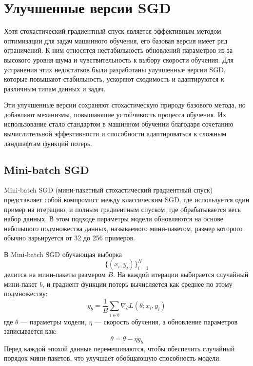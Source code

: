 \documentclass[11pt,a4paper]{article}
\begin{document}
\section{Улучшенные версии SGD}

Хотя стохастический градиентный спуск является эффективным методом оптимизации для задач машинного обучения, его базовая версия имеет ряд ограничений. К ним относятся нестабильность обновлений параметров из-за высокого уровня шума и чувствительность к выбору скорости обучения. Для устранения этих недостатков были разработаны улучшенные версии SGD, которые повышают стабильность, ускоряют сходимость и адаптируются к различным типам данных и задач.

Эти улучшенные версии сохраняют стохастическую природу базового метода, но добавляют механизмы, повышающие устойчивость процесса обучения. Их использование стало стандартом в машинном обучении благодаря сочетанию вычислительной эффективности и способности адаптироваться к сложным ландшафтам функций потерь.

\subsection{Mini-batch SGD}

Mini-batch SGD (мини-пакетный стохастический градиентный спуск) представляет собой компромисс между классическим SGD, где используется один пример на итерацию, и полным градиентным спуском, где обрабатывается весь набор данных. В этом подходе параметры модели обновляются на основе небольшого подмножества данных, называемого мини-пакетом, размер которого обычно варьируется от 32 до 256 примеров.

В Mini-batch SGD обучающая выборка 
\begin{equation}
\{(x_i, y_i)\}_{i=1}^N
\end{equation}
делится на мини-пакеты размером \( B \). На каждой итерации выбирается случайный мини-пакет \( b \), и градиент функции потерь вычисляется как среднее по этому подмножеству:
\begin{equation}
g_b = \frac{1}{B} \sum_{i \in b} \nabla_\theta L(\theta; x_i, y_i)
\end{equation}
где \( \theta \) — параметры модели, \( \eta \) — скорость обучения, а обновление параметров записывается как:
\begin{equation}
\theta = \theta - \eta g_b
\end{equation}
Перед каждой эпохой данные перемешиваются, чтобы обеспечить случайный порядок мини-пакетов, что улучшает обобщающую способность модели.
\end{document}

